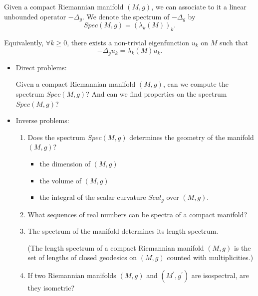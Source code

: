 Given a compact Riemannian manifold $(M,g)$, we can associate to it a linear unbounded operator $-\Delta_g$. We denote the spectrum of $-\Delta_g$ by 
$$Spec(M,g) = (\lambda_k(M))_k.$$

Equivalently, $\forall k \geq 0$, there exists a non-trivial eigenfunction $u_k$ on $M$  such that 
$$-\Delta_g u_k = \lambda_k(M) u_k.$$

\begin{itemize}
    \item Direct problems: 
    
    Given a compact Riemannian manifold $(M,g)$, can we compute the spectrum $Spec(M,g)$? And can we find properties on the spectrum $Spec(M,g)$?
    \item Inverse problems: 
    \begin{enumerate}
        \item Does the spectrum $Spec(M,g)$ determines the geometry of the manifold $(M,g)$? 
        \begin{itemize}
            \item the dimension of $(M,g)$
            \item the volume of $(M,g)$
            \item the integral of the scalar curvature $Scal_g$ over $(M,g)$.
        \end{itemize}
        
        \item What sequences of real numbers can be spectra of a compact manifold?
        
        \item The spectrum of the manifold determines its length spectrum. 
        
        (The length spectrum of a compact Riemannian manifold $(M,g)$ is the set of lengths of closed geodesics on $(M,g)$ counted with multiplicities.)
        
        \item If two Riemannian manifolds $(M,g)$ and $(M^\prime,g^\prime)$ are isospectral, are they isometric?
    \end{enumerate}
    \end{itemize}
    
